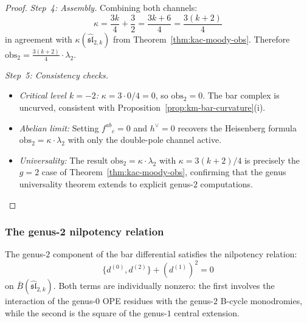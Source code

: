 \begin{proof}
\emph{Step~4: Assembly.}
Combining both channels:
\begin{equation}
\kappa = \frac{3k}{4} + \frac{3}{2}
= \frac{3k + 6}{4} = \frac{3(k+2)}{4}
\end{equation}
in agreement with $\kappa(\widehat{\mathfrak{sl}}_{2,k})$ from
Theorem~\ref{thm:kac-moody-obs}.
Therefore $\mathrm{obs}_2 = \frac{3(k+2)}{4} \cdot \lambda_2$.

\emph{Step~5: Consistency checks.}
\begin{itemize}
\item \emph{Critical level $k = -2$:}
$\kappa = 3 \cdot 0/4 = 0$, so $\mathrm{obs}_2 = 0$.
The bar complex is uncurved, consistent with
Proposition~\ref{prop:km-bar-curvature}(i).
\item \emph{Abelian limit:}
Setting $f^{ab}{}_c = 0$ and $h^\vee = 0$ recovers the
Heisenberg formula $\mathrm{obs}_2 = \kappa \cdot \lambda_2$
with only the double-pole channel active.
\item \emph{Universality:} The result $\mathrm{obs}_2 =
\kappa \cdot \lambda_2$ with $\kappa = 3(k+2)/4$ is
precisely the $g = 2$ case of
Theorem~\ref{thm:kac-moody-obs}, confirming that the
genus universality theorem extends to explicit genus-$2$
computations.
\end{itemize}
\end{proof}

\subsubsection{The genus-2 nilpotency relation}

\begin{proposition}\label{prop:sl2-genus2-relation}
The genus-$2$ component of the bar differential satisfies the
nilpotency relation:
\begin{equation}\label{eq:sl2-genus2-nil}
\{d^{(0)}, d^{(2)}\} + (d^{(1)})^2 = 0
\end{equation}
on $\bar{B}(\widehat{\mathfrak{sl}}_{2,k})$.  Both terms are
individually nonzero: the first involves the interaction of the
genus-$0$ OPE residues with the genus-$2$ B-cycle monodromies, while
the second is the square of the genus-$1$ central extension.
\end{proposition}

